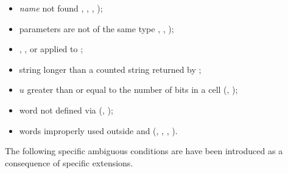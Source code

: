 \begin{itemize}
\item \emph{name} not found ,
	, ,
	);

\item parameters are not of the same type ,
	, );

\item {},
	,
	 or
	 applied to ;

\item string longer than a counted string returned by
	;

\item $u$ greater than or equal to the number of bits in a cell
	(, );

\item word not defined via 
	(, );

\item words improperly used outside
	 and 
	(, ,
	 , ).
\end{itemize}

The following specific ambiguous conditions are have been introduced
as a consequence of specific extensions.

